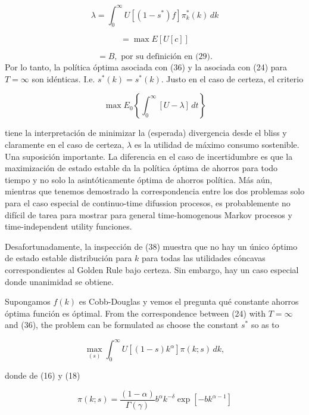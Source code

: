 \documentclass[a4paper,12pt]{article}
\begin{document}
		\begin{equation}
\lambda = \int_0^\infty U[(1 - s^*)f] \pi_k^*(k) \, dk
		\end{equation}

		\begin{equation}
= \max E \left[ U[c] \right]
		\end{equation}

		\begin{equation}
= B, \text{ por su definición en (29).}
		\end{equation}
Por lo tanto, la política óptima asociada con (36) y la asociada con (24) para \( T = \infty \) son idénticas. I.e. \( s^*(k) = s^*(k) \). Justo en el caso de certeza, el criterio

		\begin{equation}
\max E_0 \left\{ \int_0^\infty [U - \lambda] \, dt \right\}
		\end{equation}

tiene la interpretación de minimizar la (esperada) divergencia desde el bliss y claramente en el caso de certeza, \( \lambda \) es la utilidad de máximo consumo sostenible. Una suposición importante. La diferencia en el caso de incertidumbre es que la maximización de estado estable da la política óptima de ahorros para todo tiempo y no solo la asintóticamente óptima de ahorros política. Más aún, mientras que tenemos demostrado la correspondencia entre los dos problemas solo para el caso especial de continuo-time difussion procesos, es probablemente no difícil de tarea para mostrar para general time-homogenous Markov procesos y time-independent utility funciones.

Desafortunadamente, la inspección de (38) muestra que no hay un único óptimo de estado estable distribución para \( k \) para todas las utilidades cóncavas correspondientes al Golden Rule bajo certeza. Sin embargo, hay un caso especial donde unanimidad se obtiene.

Supongamos \( f(k) \) es Cobb-Douglas y vemos el pregunta qué constante ahorros óptima función es óptimal. From the correspondence between (24) with \( T = \infty \) and (36), the problem can be formulated as choose the constant \( s^* \) so as to

		\begin{equation}
\max_{(s)} \int_0^\infty U[(1 - s) k^\alpha] \pi(k; s) \, dk,
		\end{equation}

donde de (16) y (18)

		\begin{equation}
\pi(k; s) = \frac{(1 - \alpha)}{\Gamma(\gamma)} b^\alpha k^{ - \delta} \exp \left[ - b k^{\alpha - 1} \right]
		\end{equation}
\end{document}
